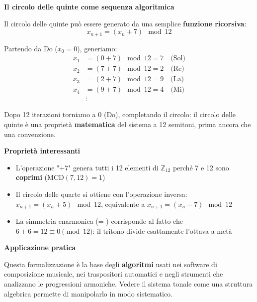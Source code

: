 \begin{matematica}
	\textbf{Il circolo delle quinte come sequenza algoritmica}
	
	Il circolo delle quinte può essere generato da una semplice \textbf{funzione ricorsiva}:
	\[
	x_{n+1} = (x_n + 7) \mod 12
	\]
	
	Partendo da Do ($x_0 = 0$), generiamo:
	\begin{align*}
	x_1 &= (0 + 7) \mod 12 = 7 \quad \text{(Sol)} \\
	x_2 &= (7 + 7) \mod 12 = 2 \quad \text{(Re)} \\
	x_3 &= (2 + 7) \mod 12 = 9 \quad \text{(La)} \\
	x_4 &= (9 + 7) \mod 12 = 4 \quad \text{(Mi)} \\
	&\vdots
	\end{align*}
	
	Dopo 12 iterazioni torniamo a 0 (Do), completando il circolo: il circolo delle quinte è una proprietà \textbf{matematica} del sistema a 12 semitoni, prima ancora che una convenzione.
	
	\textbf{Proprietà interessanti}
	
	\begin{itemize}
		\item L'operazione "+7" genera tutti i 12 elementi di $\mathbb{Z}_{12}$ perché 7 e 12 sono \textbf{coprimi} ($\text{MCD}(7, 12) = 1$)
		\item Il circolo delle quarte si ottiene con l'operazione inversa: $x_{n+1} = (x_n + 5) \mod 12$, equivalente a $x_{n+1} = (x_n - 7) \mod 12$
		\item La simmetria enarmonica (\Fadiesis  = \Solbemolle ) corrisponde al fatto che $6 + 6 = 12 \equiv 0 \pmod{12}$: il tritono divide esattamente l'ottava a metà
	\end{itemize}
	
	\textbf{Applicazione pratica}
	
	Questa formalizzazione è la base degli \textbf{algoritmi} usati nei software di composizione musicale, nei traspositori automatici e negli strumenti che analizzano le progressioni armoniche. Vedere il sistema tonale come una struttura algebrica permette di manipolarlo in modo sistematico.
\end{matematica}
